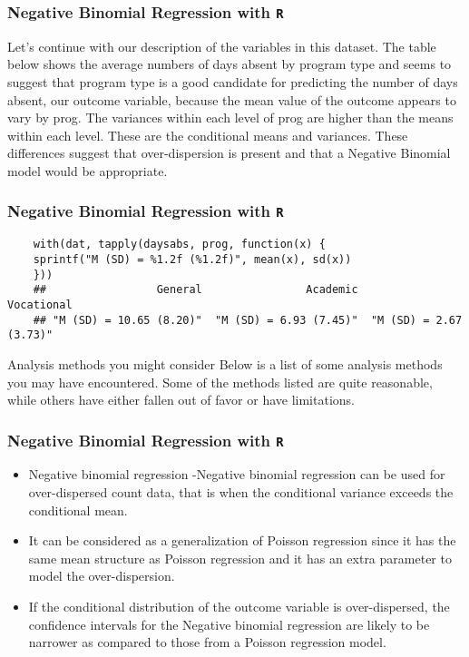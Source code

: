 \documentclass[00-GLMregslides.tex]{subfiles}
\begin{document}
\begin{frame}[fragile]
	\frametitle{Negative Binomial Regression with \texttt{R} }
	\Large
	
	Let's continue with our description of the variables in this dataset. The table below shows the average numbers of days absent by program type and seems to suggest that program type is a good candidate for predicting the number of days absent, our outcome variable, because the mean value of the outcome appears to vary by prog. The variances within each level of prog are higher than the means within each level. These are the conditional means and variances. These differences suggest that over-dispersion is present and that a Negative Binomial model would be appropriate.
\end{frame}
\begin{frame}[fragile]
	\frametitle{Negative Binomial Regression with \texttt{R} }
	\large
	
	\begin{verbatim}
	with(dat, tapply(daysabs, prog, function(x) {
	sprintf("M (SD) = %1.2f (%1.2f)", mean(x), sd(x))
	}))
	##                 General                Academic              Vocational 
	## "M (SD) = 10.65 (8.20)"  "M (SD) = 6.93 (7.45)"  "M (SD) = 2.67 (3.73)"
	\end{verbatim}
	
	
	Analysis methods you might consider
	Below is a list of some analysis methods you may have encountered. Some of the methods listed are quite reasonable, while others have either fallen out of favor or have limitations.
\end{frame}
\begin{frame}[fragile]
	\frametitle{Negative Binomial Regression with \texttt{R} }
	\Large
	
	\begin{itemize}
	\item Negative binomial regression -Negative binomial regression can be used for over-dispersed count data, that is when the conditional variance exceeds the conditional mean.
	\item It can be considered as a generalization of Poisson regression since it has the same mean structure as Poisson regression and it has an extra parameter to model the over-dispersion. 
	\item If the conditional distribution of the outcome variable is over-dispersed, the confidence intervals for the Negative binomial regression are likely to be narrower as compared to those from a Poisson regression model.
	\end{itemize}
	
\end{frame}
\end{document}
